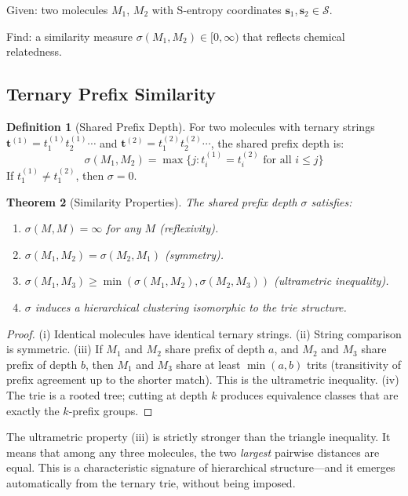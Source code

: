 \documentclass[11pt,twocolumn,a4paper]{article}
\newtheorem{theorem}{Theorem}[section]
\theoremstyle{definition}
\newtheorem{definition}[theorem]{Definition}
\theoremstyle{remark}
\newcommand{\Sspace}{\mathcal{S}}
\begin{document}
Given: two molecules $M_1$, $M_2$ with S-entropy coordinates $\mathbf{s}_1, \mathbf{s}_2 \in \Sspace$.

Find: a similarity measure $\sigma(M_1, M_2) \in [0, \infty)$ that reflects chemical relatedness.

\subsection{Ternary Prefix Similarity}

\begin{definition}[Shared Prefix Depth]
\label{def:spd}
For two molecules with ternary strings $\mathbf{t}^{(1)} = t_1^{(1)} t_2^{(1)} \cdots$ and $\mathbf{t}^{(2)} = t_1^{(2)} t_2^{(2)} \cdots$, the shared prefix depth is:
\begin{equation}
\sigma(M_1, M_2) = \max\{j : t_i^{(1)} = t_i^{(2)} \text{ for all } i \leq j\}
\label{eq:spd}
\end{equation}
If $t_1^{(1)} \neq t_1^{(2)}$, then $\sigma = 0$.
\end{definition}

\begin{theorem}[Similarity Properties]
\label{thm:similarity_props}
The shared prefix depth $\sigma$ satisfies:
\begin{enumerate}[nosep]
\item[(i)] $\sigma(M, M) = \infty$ for any $M$ (reflexivity).
\item[(ii)] $\sigma(M_1, M_2) = \sigma(M_2, M_1)$ (symmetry).
\item[(iii)] $\sigma(M_1, M_3) \geq \min(\sigma(M_1, M_2), \sigma(M_2, M_3))$ (ultrametric inequality).
\item[(iv)] $\sigma$ induces a hierarchical clustering isomorphic to the trie structure.
\end{enumerate}
\end{theorem}

\begin{proof}
(i) Identical molecules have identical ternary strings. (ii) String comparison is symmetric. (iii) If $M_1$ and $M_2$ share prefix of depth $a$, and $M_2$ and $M_3$ share prefix of depth $b$, then $M_1$ and $M_3$ share at least $\min(a,b)$ trits (transitivity of prefix agreement up to the shorter match). This is the ultrametric inequality. (iv) The trie is a rooted tree; cutting at depth $k$ produces equivalence classes that are exactly the $k$-prefix groups.
\end{proof}

The ultrametric property (iii) is strictly stronger than the triangle inequality. It means that among any three molecules, the two \emph{largest} pairwise distances are equal. This is a characteristic signature of hierarchical structure---and it emerges automatically from the ternary trie, without being imposed.
\end{document}
